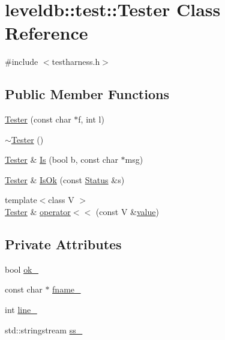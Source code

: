 \hypertarget{classleveldb_1_1test_1_1_tester}{\section{leveldb\-:\-:test\-:\-:Tester Class Reference}
\label{classleveldb_1_1test_1_1_tester}
}


{\ttfamily \#include $<$testharness.\-h$>$}

\subsection*{Public Member Functions}
\begin{DoxyCompactItemize}
\item 
\hyperlink{classleveldb_1_1test_1_1_tester_a166bc7b18483780292a44425ef5e64f7}{Tester} (const char $\ast$f, int l)
\item 
\hyperlink{classleveldb_1_1test_1_1_tester_a832d52d6aa29945cccdf762b54481295}{$\sim$\-Tester} ()
\item 
\hyperlink{classleveldb_1_1test_1_1_tester}{Tester} \& \hyperlink{classleveldb_1_1test_1_1_tester_ad75cd5ea132083b72e7fd7271ef1918a}{Is} (bool b, const char $\ast$msg)
\item 
\hyperlink{classleveldb_1_1test_1_1_tester}{Tester} \& \hyperlink{classleveldb_1_1test_1_1_tester_af0e4decc6f483a78af44926634d990c2}{Is\-Ok} (const \hyperlink{classleveldb_1_1_status}{Status} \&s)
\item 
{\footnotesize template$<$class V $>$ }\\\hyperlink{classleveldb_1_1test_1_1_tester}{Tester} \& \hyperlink{classleveldb_1_1test_1_1_tester_a4e776d487df19ac9daeed5527cd1d80e}{operator$<$$<$} (const V \&\hyperlink{cache_8cc_a0f61d63b009d0880a89c843bd50d8d76}{value})
\end{DoxyCompactItemize}
\subsection*{Private Attributes}
\begin{DoxyCompactItemize}
\item 
bool \hyperlink{classleveldb_1_1test_1_1_tester_ae6eb51d7b83389a6c9c5dc46c53fb025}{ok\-\_\-}
\item 
const char $\ast$ \hyperlink{classleveldb_1_1test_1_1_tester_ac31d6b42290908b68f6bc1957cc972d7}{fname\-\_\-}
\item 
int \hyperlink{classleveldb_1_1test_1_1_tester_a6e4f6de0a9ec707e2d00a0671f605aa9}{line\-\_\-}
\item 
std\-::stringstream \hyperlink{classleveldb_1_1test_1_1_tester_abc209cb71659871eea9df987d61cf1e0}{ss\-\_\-}
\end{DoxyCompactItemize}



